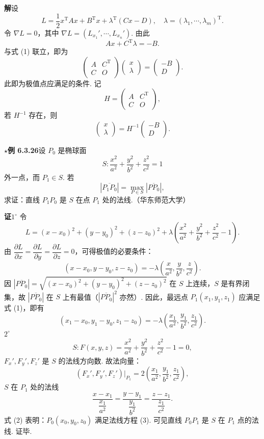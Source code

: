 \documentclass[UTF8,12pt,a4paper,fontset=fandol]{ctexart}
\begin{document}
\noindent\textbf{解}\quad 设
\[
  L=\frac12x^{\mathrm T}Ax+B^{\mathrm T}x+\lambda^{\mathrm T}(Cx-D),
  \quad \lambda=(\lambda_1,\cdots,\lambda_m)^{\mathrm T}.
\]
令 $\nabla L=0$，其中 $\nabla L=(L_{x_1}',\cdots,L_{x_n}')$. 由此
\[
  Ax+C^{\mathrm T}\lambda=-B.
\]
与式 (1) 联立，即为
\[
  \begin{pmatrix}
    A&C^{\mathrm T}\\
    C&O
  \end{pmatrix}
  \begin{pmatrix}
    x\\ \lambda
  \end{pmatrix}
  =
  \begin{pmatrix}
    -B\\D
  \end{pmatrix}.
\]
此即为极值点应满足的条件. 记
\[
  H=\begin{pmatrix}
    A&C^{\mathrm T}\\
    C&O
  \end{pmatrix},
\]
若 $H^{-1}$ 存在，则
\[
  \begin{pmatrix}
    x\\ \lambda
  \end{pmatrix}
  =
  H^{-1}
  \begin{pmatrix}
    -B\\D
  \end{pmatrix}.
\]

\noindent\textbf{\ensuremath{\star}例 6.3.26}\quad 设 $P_0$ 是椭球面
\[
  S:\frac{x^2}{a^2}+\frac{y^2}{b^2}+\frac{z^2}{c^2}=1
\]
外一点，而 $P_1\in S$. 若
\[
  |\overline{P_1P_0}|=\max_{P\in S}|\overline{PP_0}|,
\]
求证：直线 $P_1P_0$ 是 $S$ 在点 $P_1$ 处的法线.（华东师范大学）

\noindent\textbf{证}\quad $1^\circ$ 令
\[
  L=(x-x_0)^2+(y-y_0)^2+(z-z_0)^2
  +\lambda\left(\frac{x^2}{a^2}+\frac{y^2}{b^2}+\frac{z^2}{c^2}-1\right).
\]
由 $\dfrac{\partial L}{\partial x}=\dfrac{\partial L}{\partial y}=\dfrac{\partial L}{\partial z}=0$，可得极值的必要条件：
\[
  (x-x_0,y-y_0,z-z_0)=-\lambda\left(\frac{x}{a^2},\frac{y}{b^2},\frac{z}{c^2}\right). \tag{1}
\]
因 $|\overline{PP_0}|=\sqrt{(x-x_0)^2+(y-y_0)^2+(z-z_0)^2}$ 在 $S$ 上连续，$S$ 是有界闭集，故 $|\overline{PP_0}|$ 在 $S$ 上有最值（$|\overline{PP_0}|^2$ 亦然）. 因此，最远点 $P_1(x_1,y_1,z_1)$ 应满足式 (1)，即有
\[
  (x_1-x_0,y_1-y_0,z_1-z_0)
  =-\lambda\left(\frac{x_1}{a^2},\frac{y_1}{b^2},\frac{z_1}{c^2}\right). \tag{2}
\]
$2^\circ$
\[
  S:F(x,y,z)=\frac{x^2}{a^2}+\frac{y^2}{b^2}+\frac{z^2}{c^2}-1=0,
\]
$F_x',F_y',F_z'$ 是 $S$ 的法线方向数. 故法向量：
\[
  (F_x',F_y',F_z')\big|_{P_1}
  =2\left(\frac{x_1}{a^2},\frac{y_1}{b^2},\frac{z_1}{c^2}\right),
\]
$S$ 在 $P_1$ 处的法线
\[
  \frac{x-x_1}{\dfrac{x_1}{a^2}}
  =\frac{y-y_1}{\dfrac{y_1}{b^2}}
  =\frac{z-z_1}{\dfrac{z_1}{c^2}}. \tag{3}
\]
式 (2) 表明：$P_0(x_0,y_0,z_0)$ 满足法线方程 (3). 可见直线 $P_0P_1$ 是 $S$ 在 $P_1$ 点的法线. 证毕.
\end{document}
